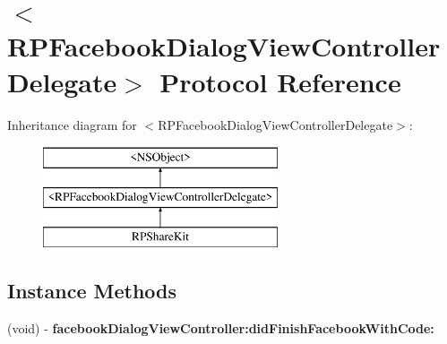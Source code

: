 \hypertarget{protocol_r_p_facebook_dialog_view_controller_delegate-p}{\section{$<$R\-P\-Facebook\-Dialog\-View\-Controller\-Delegate$>$ Protocol Reference}
\label{protocol_r_p_facebook_dialog_view_controller_delegate-p}
}
Inheritance diagram for $<$R\-P\-Facebook\-Dialog\-View\-Controller\-Delegate$>$\-:\begin{figure}[H]
\begin{center}
\leavevmode
\includegraphics[height=3.000000cm]{protocol_r_p_facebook_dialog_view_controller_delegate-p}
\end{center}
\end{figure}
\subsection*{Instance Methods}
\begin{DoxyCompactItemize}
\item 
\hypertarget{protocol_r_p_facebook_dialog_view_controller_delegate-p_ad59127d38c9afe280a7ebb81a8484385}{(void) -\/ {\bfseries facebook\-Dialog\-View\-Controller\-:did\-Finish\-Facebook\-With\-Code\-:}}\label{protocol_r_p_facebook_dialog_view_controller_delegate-p_ad59127d38c9afe280a7ebb81a8484385}

\end{DoxyCompactItemize}
